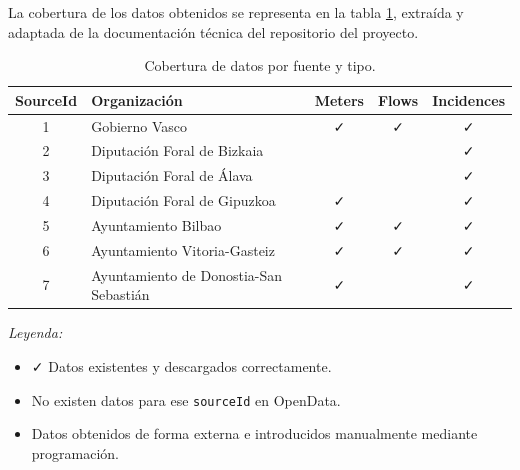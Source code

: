 La cobertura de los datos obtenidos se representa en la tabla \ref{tab:cobertura_datos_opendata}, extraída y adaptada de la documentación técnica del repositorio del proyecto.

\begin{table}[H]
	\centering
	\caption{Cobertura de datos por fuente y tipo.}
	\label{tab:cobertura_datos_opendata}
	\renewcommand{\arraystretch}{1.2}
	\begin{tabularx}{\textwidth}{cXccc}
		\toprule
		\textbf{SourceId} & \textbf{Organización} & \textbf{Meters} & \textbf{Flows} & \textbf{Incidences} \\
		\midrule
		1 & Gobierno Vasco & \textcolor{mygreen}{\faCheck} & \textcolor{mygreen}{\faCheck} & \textcolor{mygreen}{\faCheck} \\
		2 & Diputación Foral de Bizkaia & \textcolor{gray}{\faHandPaper} & \textcolor{gray}{\faHandPaper} & \textcolor{mygreen}{\faCheck} \\
		3 & Diputación Foral de Álava & \textcolor{myred}{\faTimes} & \textcolor{myred}{\faTimes} & \textcolor{mygreen}{\faCheck} \\
		4 & Diputación Foral de Gipuzkoa & \textcolor{mygreen}{\faCheck} & \textcolor{myred}{\faTimes} & \textcolor{mygreen}{\faCheck} \\
		5 & Ayuntamiento Bilbao & \textcolor{mygreen}{\faCheck} & \textcolor{mygreen}{\faCheck} & \textcolor{mygreen}{\faCheck} \\
		6 & Ayuntamiento Vitoria-Gasteiz & \textcolor{mygreen}{\faCheck} & \textcolor{mygreen}{\faCheck} & \textcolor{mygreen}{\faCheck} \\
		7 & Ayuntamiento de Donostia-San Sebastián & \textcolor{mygreen}{\faCheck} & \textcolor{myred}{\faTimes} & \textcolor{mygreen}{\faCheck} \\
		\bottomrule
	\end{tabularx}
	
	\vspace{0.5em}
	\textit{Leyenda:}
	\begin{itemize}
		\item \textcolor{mygreen}{\faCheck} Datos existentes y descargados correctamente.
		\item \textcolor{myred}{\faTimes} No existen datos para ese \texttt{sourceId} en OpenData.
		\item \textcolor{gray}{\faHandPaper} Datos obtenidos de forma externa e introducidos manualmente mediante programación.
	\end{itemize}
\end{table}

